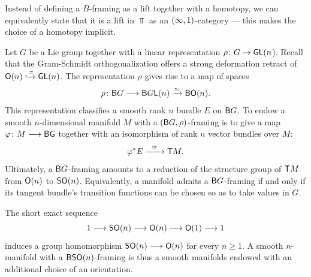 \begin{remark}
    Instead of defining a $B$-framing as a lift together with a homotopy, we can equivalently state that it is a lift in $\Top$ as an $(\operatorname{\infty},1)$-category — this makes the choice of a homotopy implicit.
\end{remark}

\begin{example}
    Let $G$ be a Lie group together with a linear representation $\rho \colon G \rightarrow \mathsf G \mathsf L(n$). Recall that the Gram-Schmidt orthogonalization offers a strong deformation retract of $\mathsf O(n) \xhookrightarrow{\simeq} \mathsf G\mathsf L(n)$. The representation $\rho$ gives rise to a map of spaces
    \begin{equation}
        \rho \colon \mathsf B G \longrightarrow \mathsf B G\mathsf L(n) \xrightarrow{\simeq} \mathsf B\mathsf O(n).
    \end{equation}
    This representation classifies a smooth rank $n$ bundle $E$ on $\mathsf B G$. To endow a smooth $n$-dimensional manifold $M$ with a $(\mathsf B G,\rho)$-framing is to give a map $\varphi\colon M \longrightarrow \mathsf B\mathsf G$ together with an isomorphism of rank $n$ vector bundles over $M$:
    \begin{equation}
        \varphi^{*}E \xrightarrow{\,\,\,\,\cong\,\,\,\,} \mathsf T M.
    \end{equation}
    Ultimately, a $\mathsf B G$-framing amounts to a reduction of the structure group of $\mathsf T M$ from $\mathsf O(n)$ to $\operatorname{\mathsf{SO}}(n)$. Equivalently, a manifold admits a $\mathsf B G$-framing if and only if its tangent bundle's transition functions can be chosen so as to take values in $G$.
\end{example}

\begin{example}
    The short exact sequence 
    \begin{equation}
        1 \longrightarrow \operatorname{\mathsf{SO}} (n) \longrightarrow \mathsf O(n) \longrightarrow \mathsf O(1) \longrightarrow 1
    \end{equation}
    induces a group homomorphism $\operatorname{\mathsf{SO}}(n) \longrightarrow \mathsf O (n)$ for every $n \geq 1$. A smooth $n$-manifold with a $\mathsf B\!\operatorname{\mathsf{SO}} (n)$-framing is thus a smooth manifolds endowed with an additional choice of an orientation.   
\end{example}

